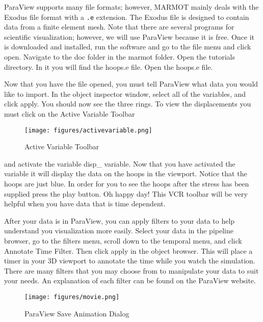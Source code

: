 \documentclass[letter,12pt,fleqn]{article}
\begin{document}
ParaView supports many file formats; however, MARMOT mainly deals with the Exodus file format with a \texttt{.e} extension. The Exodus file is designed to contain data from a finite element mesh. Note that there are several programs for scientific visualization; however, we will use ParaView because it is free. Once it is downloaded and installed, run the software and go to the file menu and click open. Navigate to the doc folder in the marmot folder. Open the tutorials directory. In it you will find the hoops.e file. Open the hoops.e file. 

Now that you have the file opened, you must tell ParaView what data you would like to import. In the object inspector window, select all of the variables, and click apply.  You should now see the three rings. To view the displacements you must click on the Active Variable Toolbar 
\begin{wrapfigure}{l}{0.45\textwidth}
  \vspace{-10pt}
  \begin{center}
    \texttt{[image: figures/activevariable.png]}
  \end{center}
  \vspace{-5pt}
  \caption{Active Variable Toolbar}
  \vspace{-5pt}
\end{wrapfigure}
and activate the variable disp\_ variable. Now that you have activated the variable it will display the data on the hoops in the viewport. Notice that the hoops are just blue. In order for you to see the hoops after the stress has been supplied press the play button. Oh happy day! This VCR toolbar will be very helpful when you have data that is time dependent.

After your data is in ParaView, you can apply filters to your data to help understand you visualization more easily. Select your data in the pipeline browser, go to the filters menu, scroll down to the temporal menu, and click Annotate Time Filter. Then click apply in the object browser. This will place a timer in your 3D viewport to annotate the time while you watch the simulation. There are many filters that you may choose from to manipulate your data to suit your needs. An explanation of each filter can be found on the ParaView website.

\begin{wrapfigure}{r}{0.50\textwidth}
  \vspace{-20pt}
  \begin{center}
    \texttt{[image: figures/movie.png]}
  \end{center}
  \vspace{-20pt}
  \caption{ParaView Save Animation Dialog}
\end{wrapfigure}
\end{document}
